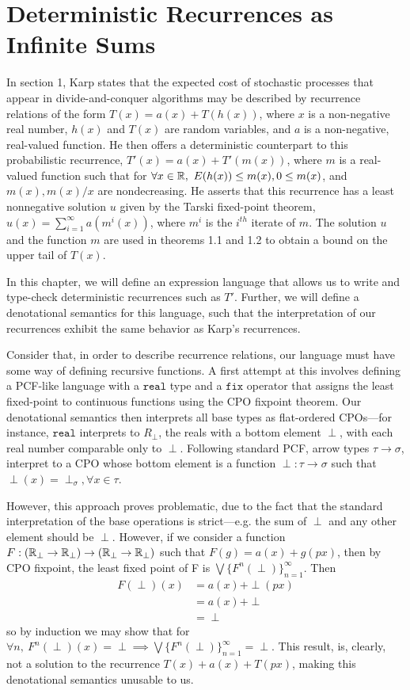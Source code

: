 \chapter{Deterministic Recurrences as Infinite Sums}
In section 1, Karp states that the expected cost of stochastic processes that appear in divide-and-conquer algorithms may be 
described by
recurrence relations of the form $T(x) = a(x) + T(h(x))$, where $x$ is a non-negative real number, $h(x)$ and $T(x)$ are 
random variables, and $a$ is a non-negative, real-valued function. He then offers a deterministic counterpart to this
probabilistic recurrence, $T'(x) = a(x) + T'(m(x))$, where $m$ is a real-valued function such that for 
$\forall x \in \mathbb{R}, \ E(h(x)) \leq m(x) , 0 \leq m(x)$, and $m(x), m(x)/x$ are nondecreasing. He asserts that this recurrence 
has a least nonnegative solution $u$ given by the Tarski fixed-point theorem, $u(x) = \sum_{i=1}^{\infty}a(m^i(x))$, where 
$m^i$ is the $i^{th}$ iterate of $m$. The solution $u$ and the function $m$ are used in theorems 1.1 and 1.2 to obtain a 
bound on the upper tail of $T(x)$.

In this chapter, we will define an expression language that allows us to write and type-check
deterministic recurrences such as $T'$. Further, we will define a denotational semantics for this language, 
such that the interpretation of our recurrences exhibit the same behavior as Karp's recurrences. 

Consider that, in order to describe recurrence relations, our language must have some way of defining recursive functions.
A first attempt at this involves defining a PCF-like language with a $\texttt{real}$ type and a $\texttt{fix}$ operator
that assigns the least fixed-point to continuous functions using the CPO fixpoint theorem. Our denotational semantics 
then interprets all base types as flat-ordered CPOs---for instance, $\texttt{real}$  interprets to $R_{\perp}$, the reals with a 
bottom element $\perp$, with each real number comparable only to $\perp$. Following standard PCF, arrow types
$\tau \rightarrow \sigma$, interpret to a CPO whose bottom element is a function $\perp: \tau \rightarrow \sigma$ such
that $\perp(x) = \perp_{\sigma}, \forall x \in \tau$.

However, this approach proves problematic, due to the fact that the standard interpretation of the base operations is strict---e.g. the 
sum of $\perp$ and any other element should be $\perp$. However, if we consider a function $F: (\mathbb{R}_{\perp} \rightarrow 
\mathbb{R}_{\perp}) \rightarrow (\mathbb{R}_{\perp} \rightarrow \mathbb{R}_{\perp})$ such that $F(g) = a(x) + g(px)$, then by CPO fixpoint, the least 
fixed point of F is $\bigvee\{F^n(\perp)\}^{\infty}_{n=1}$. Then 
\begin{align*}
F(\perp)(x) &= a(x) + \perp(px)\\
&= a(x) + \perp \\
&= \perp 
\end{align*}
so by induction we may show that for $\forall n, \ F^n(\perp)(x) = \perp \implies \bigvee\{F^n(\perp)\}^{\infty}_{n=1}  = \perp$. 
This result, is, clearly, not a solution to the recurrence $T(x) + a(x) + T(px)$, making this denotational semantics
unusable to us. 

